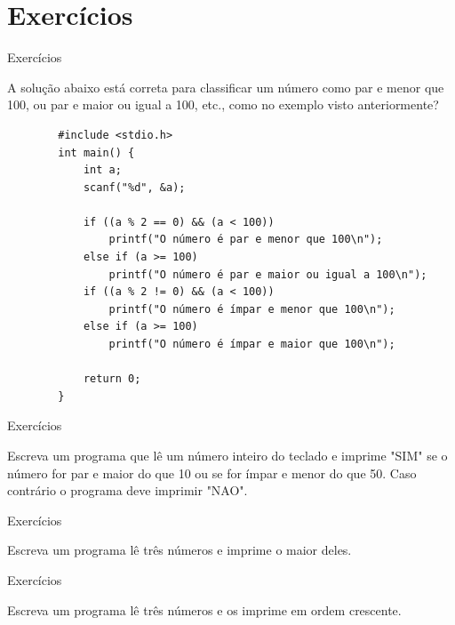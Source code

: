 \documentclass[handout]{beamer}
\begin{document}
\section{Exercícios}

\begin{frame}[fragile]{Exercícios}

    A solução abaixo está correta para classificar um número como par e menor que 100, ou par e maior ou igual a 100, etc., como no exemplo visto anteriormente?
    \vspace{-1em}
    \begin{verbatim}
        #include <stdio.h>
        int main() {
            int a;
            scanf("%d", &a);

            if ((a % 2 == 0) && (a < 100))
                printf("O número é par e menor que 100\n");
            else if (a >= 100)
                printf("O número é par e maior ou igual a 100\n");
            if ((a % 2 != 0) && (a < 100))
                printf("O número é ímpar e menor que 100\n");
            else if (a >= 100)
                printf("O número é ímpar e maior que 100\n");

            return 0;
        }
    \end{verbatim}
\end{frame}

\begin{frame}[fragile]{Exercícios}

    Escreva um programa que lê um número inteiro do teclado e imprime "SIM" se o número for par e maior do que 10 ou se for ímpar e menor do que 50.
    Caso contrário o programa deve imprimir "NAO".

\end{frame}

\begin{frame}[fragile]{Exercícios}

    Escreva um programa lê três números e imprime o maior deles.

\end{frame}

\begin{frame}[fragile]{Exercícios}

    Escreva um programa lê três números e os imprime em ordem crescente.

\end{frame}
\end{document}
